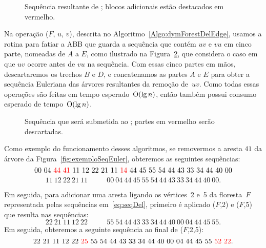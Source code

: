 \begin{figure}[htb]
\centering

\caption{Sequência resultante de \dymForestAddEdge{}; blocos adicionais estão destacados em vermelho.}
\label{fig:algorit-link-seqxy}
\end{figure}

Na operação \dymForestDelEdge($F$, $u$, $v$), descrita no Algoritmo~\ref{Algo:dymForestDelEdge}, usamos a rotina \treapSplit{} para fatiar a ABB que guarda a sequência que contém $uv$ e $vu$ em cinco parte, nomeadas de $A$ a $E$, como ilustrado na Figura~\ref{fig:algorit-cut-seqxy}, que considera o caso em que $uv$ ocorre antes de $vu$ na sequência. Com essas cinco partes em mãos, descartaremos os trechos $B$ e $D$, e concatenamos as partes $A$ e $E$ para obter a sequência Euleriana das árvores resultantes da remoção de~$uv$. Como todas essas operações são feitas em tempo esperado~$\mathrm{O}(\lg n)$, então \dymForestDelEdge{} também possui consumo esperado de tempo~$\mathrm{O}(\lg n)$.

\begin{figure}[htb]
\centering

\caption{Sequência que será submetida ao \dymForestDelEdge{}; partes em vermelho serão descartadas.}
\label{fig:algorit-cut-seqxy}
\end{figure}

Como exemplo do funcionamento desses algoritmos, se removermos a aresta $41$ da árvore da Figura~\ref{fig:exemploSeqEuler}, obteremos as seguintes sequências:
\begin{equation}
00~04~{\color{red} 44~41}~11~12~22~21~11~{\color{red} 14}~44~45~55~54~44~43~33~34~44~40~00\nonumber
\end{equation}
\begin{equation}
11~12~22~21~11~~~~~~~~~~~~00~04~44~45~55~54~44~43~33~34~44~40~00.\label{eq:seqDel}
\end{equation}

Em seguida, para adicionar uma aresta ligando os vértices~2 e~5 da floresta~$F$ representada pelas sequências em~\eqref{eq:seqDel}, primeiro é aplicado \ETmovetofront($F$,2) e \ETmovetofront($F$,5) que resulta nas sequências:
\begin{equation}
22~21~11~12~22   ~~~~~~~~~~~~55~54~44~43~33~34~44~40~00~04~44~45~55.\nonumber
\end{equation}%
Em seguida, obteremos a seguinte sequência ao final de \ETTAddEdge($F$,2,5):
\begin{equation}
22~21~11~12~22~{\color{red} 25}~55~54~44~43~33~34~44~40~00~04~44~45~55~{\color{red} 52~22}.\nonumber
\end{equation}%

